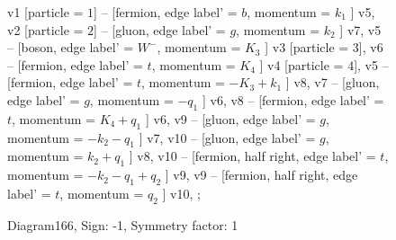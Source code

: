 \documentclass{revtex4}
\begin{document}
\begin{figure}[!htb]
\begin{center}
{    %
v1 [particle = \(1\)] -- [fermion, edge label' = \(b\), momentum = \(k_{1}\) ] v5, 
v2 [particle = \(2\)] -- [gluon, edge label' = \(g\), momentum = \(k_{2}\) ] v7, 
v5 -- [boson, edge label' = \(W^{-}\), momentum = \(K_{3}\) ] v3 [particle = \(3\)], 
v6 -- [fermion, edge label' = \(t\), momentum = \(K_{4}\) ] v4 [particle = \(4\)], 
v5 -- [fermion, edge label' = \(t\), momentum = \(-K_{3} + k_{1}\) ] v8, 
v7 -- [gluon, edge label' = \(g\), momentum = \(-q_{1}\) ] v6, 
v8 -- [fermion, edge label' = \(t\), momentum = \(K_{4} + q_{1}\) ] v6, 
v9 -- [gluon, edge label' = \(g\), momentum = \(-k_{2} - q_{1}\) ] v7, 
v10 -- [gluon, edge label' = \(g\), momentum = \(k_{2} + q_{1}\) ] v8, 
v10 -- [fermion, half right, edge label' = \(t\), momentum = \(-k_{2} - q_{1} + q_{2}\) ] v9, 
v9 -- [fermion, half right, edge label' = \(t\), momentum = \(q_{2}\) ] v10, 
};
\end{center}
\caption{Diagram166, Sign: -1, Symmetry factor: 1}
\end{figure}
\newpage
\end{document}
